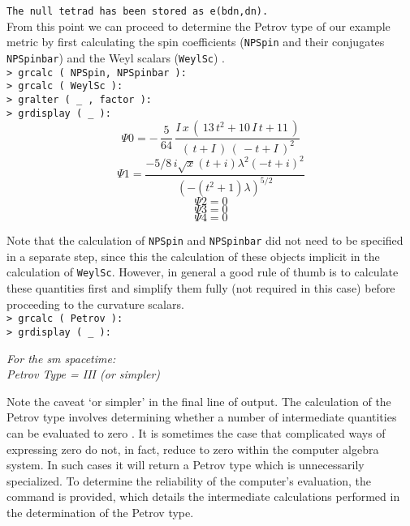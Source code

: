 \documentclass{article}
\begin{document}
{\indent\texttt{The null tetrad has been stored as e(bdn,dn).}\\

\noindent From this point we can proceed to determine the Petrov
type of our example metric by first calculating the spin coefficients
(\texttt{NPSpin} and their conjugates \texttt{NPSpinbar}) and the Weyl
scalars (\texttt{WeylSc}) \cite{newman/penrose:1962}.\\

\noindent\texttt{> grcalc ( NPSpin, NPSpinbar ):\\
> grcalc ( WeylSc ):\\
> gralter ( \_ , factor ):\\
> grdisplay ( \_ ):}
  \[ { \Psi 0}= - \,{\displaystyle \frac {5}{64}}\,{\displaystyle 
    \frac {{I}\,{x}\,(\,13\,{t}^{2} + 10\,{I}\,{t} + 11\,)}{(\,{t} + 
    {I}\,)\,(\, - {t} + {I}\,)^{2}}} \]
  \[ { \Psi 1}={\frac {-5/8\,i\sqrt {x} \left( t+i \right) {\lambda}^{2} \left( -t+i
 \right) ^{2}}{ \left( - \left( {t}^{2}+1 \right) \lambda \right) ^{5/
2}}} \]
  \[ { \Psi 2}=0 \]
  \[ { \Psi 3}=0 \]
  \[ { \Psi 4}=0 \]

\noindent Note that the calculation of \texttt{NPSpin} and \texttt{NPSpinbar}
did not need to be specified in a separate step, since this
the calculation of these objects implicit in the calculation of
\texttt{WeylSc}. However, in general a good rule of thumb is to calculate
these quantities first and simplify them fully (not required in this
case) before proceeding to the curvature scalars.\\

\noindent\texttt{> grcalc ( Petrov ):\\
> grdisplay ( \_ ):}
\begin{center}\textit{For the sm spacetime:\\
  Petrov Type = III (or simpler)}
\end{center}
\noindent Note the caveat `or simpler' in the final line of output. The
calculation of the Petrov type involves determining whether a number of
intermediate quantities can be evaluated to zero
\cite{letniowski/mclenaghan:1988}.
It is sometimes the case that complicated ways of expressing zero do not, in
fact, reduce to zero within the computer algebra system. In such cases it will 
return a Petrov type which is unnecessarily specialized. To determine the
reliability of the computer's evaluation, the  command
is provided, which details the intermediate calculations performed in
the determination of the Petrov type.\\

}
\end{document}
